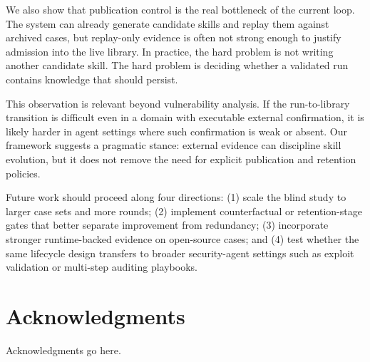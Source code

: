 ﻿\documentclass[preprint,12pt]{elsarticle}
\begin{document}
We also show that publication control is the real bottleneck of the
current loop.  The system can already generate candidate skills and replay
them against archived cases, but replay-only evidence is often not strong
enough to justify admission into the live library.  In practice, the hard
problem is not writing another candidate skill.  The hard problem is
deciding whether a validated run contains knowledge that should persist.

This observation is relevant beyond vulnerability analysis.  If the
run-to-library transition is difficult even in a domain with executable
external confirmation, it is likely harder in agent settings where such
confirmation is weak or absent.  Our framework suggests a pragmatic stance:
external evidence can discipline skill evolution, but it does not remove
the need for explicit publication and retention policies.

Future work should proceed along four directions: (1) scale the blind study
to larger case sets and more rounds; (2) implement counterfactual or
retention-stage gates that better separate improvement from redundancy; (3)
incorporate stronger runtime-backed evidence on open-source cases; and (4)
test whether the same lifecycle design transfers to broader security-agent
settings such as exploit validation or multi-step auditing playbooks.

\section*{Acknowledgments}
Acknowledgments go here.



\end{document}
